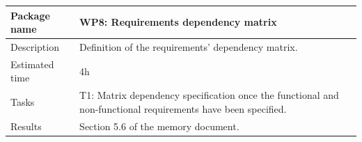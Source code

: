 \documentclass[a4paper, 12pt, oneside]{book}
\begin{document}
\vspace*{16pt}
\begin{tabularx}{\textwidth}{| l | X |}
	\hline
	\rowcolor{rowColor}
	{\semibf Package name}   & {\semibf WP8}: Requirements dependency matrix          \\
	\hline
	{\semibf Description}    & Definition of the requirements' dependency matrix.     \\
	\hline
	\rowcolor{rowColor}
	{\semibf Estimated time} & 4h                                                     \\
	\hline
	{\semibf Tasks}          & {\semibf T1}: Matrix dependency specification once the
	functional and non-functional requirements have been specified.                   \\
	\hline
	\rowcolor{rowColor}
	{\semibf Results}        & Section 5.6 of the memory document.                    \\
	\hline
\end{tabularx}
\end{document}
